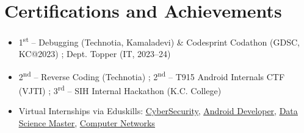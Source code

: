\documentclass[a4paper,11pt]{article}
\newcommand{\resumeItem}[1]{
  \item\small{#1}
}
\newcommand{\resumeItemListStart}{\begin{itemize}[rightmargin=0.11in]}
\newcommand{\resumeItemListEnd}{\end{itemize}}
\begin{document}
\section{Certifications and Achievements}
\resumeItemListStart{}
  \resumeItem{1\textsuperscript{st} – Debugging (Technotia, Kamaladevi) \& Codesprint Codathon (GDSC, KC@2023) ; Dept. Topper (IT, 2023–24)} 
  \resumeItem{2\textsuperscript{nd} – Reverse Coding (Technotia) ; 2\textsuperscript{nd} – T915 Android Internals CTF (VJTI) ; 3\textsuperscript{rd} – SIH Internal Hackathon (K.C. College)}
  \resumeItem{Virtual Internships via Eduskills: \href{https://aictecert.eduskillsfoundation.org/pages/home/verify.php?cert=302f1886823167c7ef0ef578223c072f}{\uline{CyberSecurity}}, \href{https://aictecert.eduskillsfoundation.org/pages/home/verify.php?cert=9d7218a4a5c5ededd2b49dfc987bbf61}{\uline{Android Developer}}, \href{https://aictecert.eduskillsfoundation.org/pages/home/verify.php?cert=13bcb2d0ecf9d2b4c0cfd2e236300456}{\uline{Data Science Master}}, \href{https://aictecert.eduskillsfoundation.org/pages/home/verify.php?cert=cfae1e9e1eecb2a6b907475e90b5e31f}{\uline{Computer Networks}}}

\resumeItemListEnd{}

\end{document}
